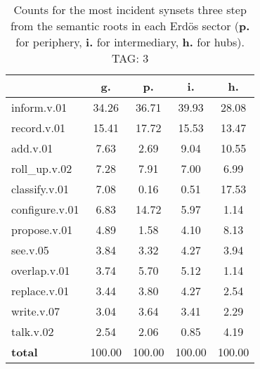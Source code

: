 \begin{table}[h!]
\begin{center}
\begin{tabular}{| l | c | c | c | c |}\hline
 & g. & p. & i. & h. \\\hline
inform.v.01 & 34.26  & 36.71  & 39.93  & 28.08 \\\hline
record.v.01 & 15.41  & 17.72  & 15.53  & 13.47 \\\hline
add.v.01 & 7.63  & 2.69  & 9.04  & 10.55 \\\hline
roll\_up.v.02 & 7.28  & 7.91  & 7.00  & 6.99 \\\hline
classify.v.01 & 7.08  & 0.16  & 0.51  & 17.53 \\\hline
configure.v.01 & 6.83  & 14.72  & 5.97  & 1.14 \\\hline
propose.v.01 & 4.89  & 1.58  & 4.10  & 8.13 \\\hline
see.v.05 & 3.84  & 3.32  & 4.27  & 3.94 \\\hline
overlap.v.01 & 3.74  & 5.70  & 5.12  & 1.14 \\\hline
replace.v.01 & 3.44  & 3.80  & 4.27  & 2.54 \\\hline
write.v.07 & 3.04  & 3.64  & 3.41  & 2.29 \\\hline
talk.v.02 & 2.54  & 2.06  & 0.85  & 4.19 \\\hline
{{\bf total}} & 100.00  & 100.00  & 100.00  & 100.00 \\\hline
\end{tabular}
\caption{Counts for the most incident synsets three step from the semantic roots in each Erd\"os sector ({\bf p.} for periphery, {\bf i.} for intermediary, {\bf h.} for hubs). TAG: 3}
\end{center}
\end{table}